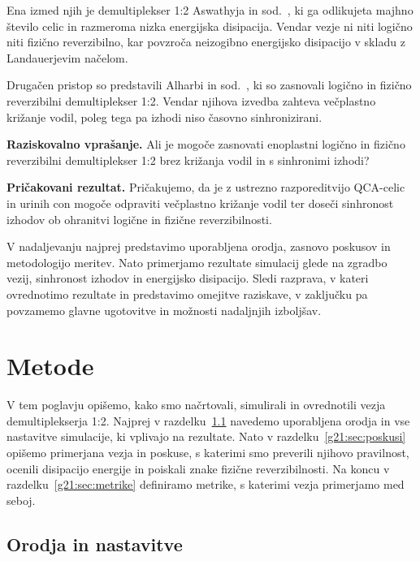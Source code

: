 Ena izmed njih je demultiplekser 1:2 Aswathyja in sod.~\cite{g21:aswathy2024}, ki ga odlikujeta majhno število celic in razmeroma nizka energijska disipacija. Vendar vezje ni niti logično niti fizično reverzibilno, kar povzroča neizogibno energijsko disipacijo v skladu z Landauerjevim načelom.

Drugačen pristop so predstavili Alharbi in sod.~\cite{g21:alharbi2022}, ki so zasnovali logično in fizično reverzibilni demultiplekser 1:2. Vendar njihova izvedba zahteva večplastno križanje vodil, poleg tega pa izhodi niso časovno sinhronizirani.

\begin{svgraybox}
\textbf{Raziskovalno vprašanje.}
Ali je mogoče zasnovati enoplastni logično in fizično reverzibilni demultiplekser 1:2 brez križanja vodil in s sinhronimi izhodi?

\medskip
\textbf{Pričakovani rezultat.}
Pričakujemo, da je z ustrezno razporeditvijo QCA-celic in urinih con mogoče odpraviti večplastno križanje vodil ter doseči sinhronost izhodov ob ohranitvi logične in fizične reverzibilnosti.
\end{svgraybox}

V nadaljevanju najprej predstavimo uporabljena orodja, zasnovo poskusov in metodologijo meritev. Nato primerjamo rezultate simulacij glede na zgradbo vezij, sinhronost izhodov in energijsko disipacijo. Sledi razprava, v kateri ovrednotimo rezultate in predstavimo omejitve raziskave, v zaključku pa povzamemo glavne ugotovitve in možnosti nadaljnjih izboljšav.

\section{Metode}
\label{g21:sec:metode}

V tem poglavju opišemo, kako smo načrtovali, simulirali in ovrednotili vezja demultiplekserja 1:2. Najprej v razdelku~\ref{g21:sec:orodja} navedemo uporabljena orodja in vse nastavitve simulacije, ki vplivajo na rezultate. Nato v razdelku~\ref{g21:sec:poskusi} opišemo primerjana vezja in poskuse, s katerimi smo preverili njihovo pravilnost, ocenili disipacijo energije in poiskali znake fizične reverzibilnosti. Na koncu v razdelku~\ref{g21:sec:metrike} definiramo metrike, s katerimi vezja primerjamo med seboj.

\subsection{Orodja in nastavitve}
\label{g21:sec:orodja}


